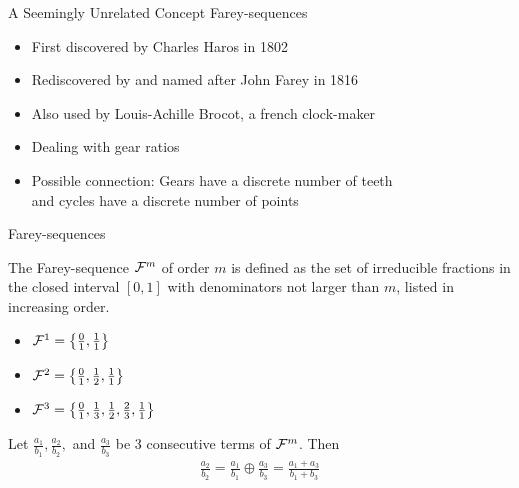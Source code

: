 \begin{frame}{A Seemingly Unrelated Concept}
	Farey-sequences
	\begin{itemize}
		\item First discovered by Charles Haros in 1802
		\item Rediscovered by and named after John Farey in 1816
		      \pause
		\item Also used by Louis-Achille Brocot, a french clock-maker
		\item Dealing with gear ratios
		      \pause
		\item Possible connection: Gears have a discrete number of teeth \\
		      and cycles have a discrete number of points
	\end{itemize}
\end{frame}

\begin{frame}{Farey-sequences}
	\vspace{-1em}
	\begin{definition}
		The Farey-sequence $\mathcal{F}^m$ of order $m$ is defined as the set of irreducible fractions in the closed interval $[0, 1]$
		with denominators not larger than $m$, listed in increasing order.
	\end{definition}
	\pause
	\begin{itemize}
		\item $\mathcal{F}^1 = \left\{ \frac{0}{1}, \frac{1}{1} \right\}$ \vspace{.1em}
		\item $\mathcal{F}^2 = \left\{ \frac{0}{1}, \frac{1}{2}, \frac{1}{1} \right\}$ \vspace{.1em}
		\item $\mathcal{F}^3 = \left\{ \frac{0}{1}, \frac{1}{3}, \frac{1}{2}, \frac{2}{3}, \frac{1}{1} \right\}$
	\end{itemize}
	\pause
	\begin{theorem}
		Let $\frac{a_1}{b_1}, \frac{a_2}{b_2},$ and $\frac{a_3}{b_3}$ be 3 consecutive terms of $\mathcal{F}^m$. Then
		\begin{align*}
			\frac{a_2}{b_2} = \frac{a_1}{b_1} \oplus \frac{a_3}{b_3} = \frac{a_1 + a_3}{b_1 + b_3}
		\end{align*}
	\end{theorem}
\end{frame}

